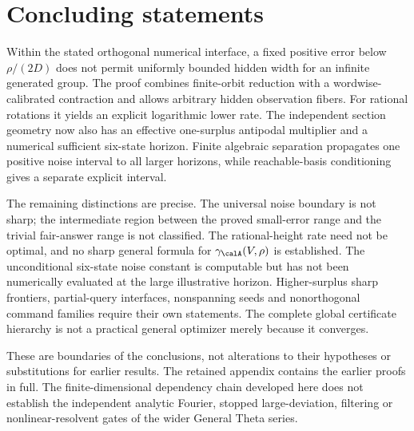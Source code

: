 \section{Concluding statements}\label{sec:conclusion52}
Within the stated orthogonal numerical interface, a fixed positive
error below $\rho/(2D)$ does not permit uniformly bounded hidden width
for an infinite generated group. The proof combines finite-orbit
reduction with a wordwise-calibrated contraction and allows arbitrary
hidden observation fibers. For rational rotations it yields an
explicit logarithmic lower rate. The independent section geometry now
also has an effective one-surplus antipodal multiplier and a numerical
sufficient six-state horizon. Finite algebraic separation propagates
one positive noise interval to all larger horizons, while reachable-basis
conditioning gives a separate explicit interval.

The remaining distinctions are precise. The universal noise boundary
is not sharp; the intermediate region between the proved small-error
range and the trivial fair-answer range is not classified. The
rational-height rate need not be optimal, and no sharp general formula
for $\gamma_{\calA}(V,\rho)$ is established. The unconditional
six-state noise constant is computable but has not been numerically
evaluated at the large illustrative horizon. Higher-surplus sharp
frontiers, partial-query interfaces, nonspanning seeds and
nonorthogonal command families require their own statements. The
complete global certificate hierarchy is not a practical general
optimizer merely because it converges.

These are boundaries of the conclusions, not alterations to their
hypotheses or substitutions for earlier results. The retained appendix
contains the earlier proofs in full. The finite-dimensional dependency
chain developed here does not establish the independent analytic
Fourier, stopped large-deviation, filtering or nonlinear-resolvent
gates of the wider General Theta series.
